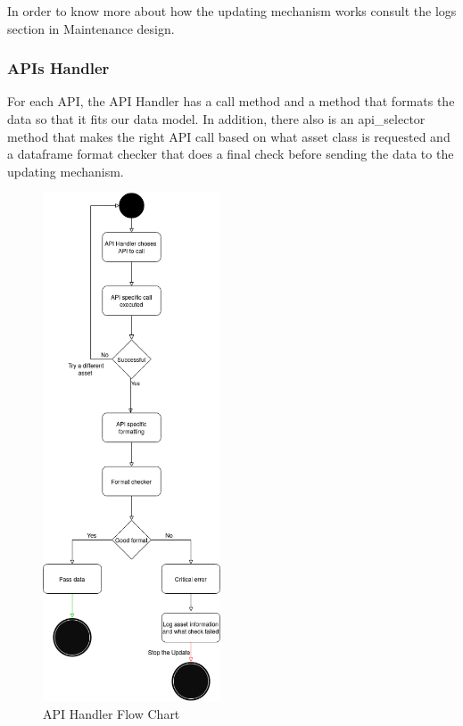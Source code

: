 \documentclass[main.tex]{subfiles}
\begin{document}
In order to know more about how the updating mechanism works consult the logs section in Maintenance design.


\subsubsection{APIs Handler}
For each API, the API Handler has a call method and a method that formats the data so that it fits our data model. In addition, there also is an api\_selector method that makes the right API call based on what asset class is requested and a dataframe format checker that does a final check before sending the data to the updating mechanism. 


\begin{figure}[H]
    \centering
    \caption{API Handler Flow Chart\cite{TR}}
	\includegraphics[width=0.47\textwidth]{04Design/04Pictures/api_handler_v2.png}
\end{figure}
\end{document}
